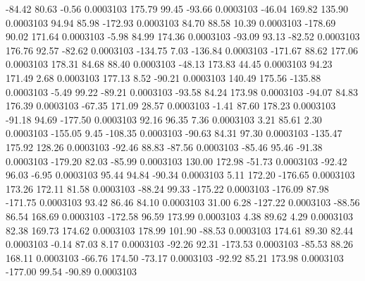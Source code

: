       -84.42       80.63       -0.56     0.0003103
      175.79       99.45      -93.66     0.0003103
      -46.04      169.82      135.90     0.0003103
       94.94       85.98     -172.93     0.0003103
       84.70       88.58       10.39     0.0003103
     -178.69       90.02      171.64     0.0003103
       -5.98       84.99      174.36     0.0003103
      -93.09       93.13      -82.52     0.0003103
      176.76       92.57      -82.62     0.0003103
     -134.75        7.03     -136.84     0.0003103
     -171.67       88.62      177.06     0.0003103
      178.31       84.68       88.40     0.0003103
      -48.13      173.83       44.45     0.0003103
       94.23      171.49        2.68     0.0003103
      177.13        8.52      -90.21     0.0003103
      140.49      175.56     -135.88     0.0003103
       -5.49       99.22      -89.21     0.0003103
      -93.58       84.24      173.98     0.0003103
      -94.07       84.83      176.39     0.0003103
      -67.35      171.09       28.57     0.0003103
       -1.41       87.60      178.23     0.0003103
      -91.18       94.69     -177.50     0.0003103
       92.16       96.35        7.36     0.0003103
        3.21       85.61        2.30     0.0003103
     -155.05        9.45     -108.35     0.0003103
      -90.63       84.31       97.30     0.0003103
     -135.47      175.92      128.26     0.0003103
      -92.46       88.83      -87.56     0.0003103
      -85.46       95.46      -91.38     0.0003103
     -179.20       82.03      -85.99     0.0003103
      130.00      172.98      -51.73     0.0003103
      -92.42       96.03       -6.95     0.0003103
       95.44       94.84      -90.34     0.0003103
        5.11      172.20     -176.65     0.0003103
      173.26      172.11       81.58     0.0003103
      -88.24       99.33     -175.22     0.0003103
     -176.09       87.98     -171.75     0.0003103
       93.42       86.46       84.10     0.0003103
       31.00        6.28     -127.22     0.0003103
      -88.56       86.54      168.69     0.0003103
     -172.58       96.59      173.99     0.0003103
        4.38       89.62        4.29     0.0003103
       82.38      169.73      174.62     0.0003103
      178.99      101.90      -88.53     0.0003103
      174.61       89.30       82.44     0.0003103
       -0.14       87.03        8.17     0.0003103
      -92.26       92.31     -173.53     0.0003103
      -85.53       88.26      168.11     0.0003103
      -66.76      174.50      -73.17     0.0003103
      -92.92       85.21      173.98     0.0003103
     -177.00       99.54      -90.89     0.0003103
